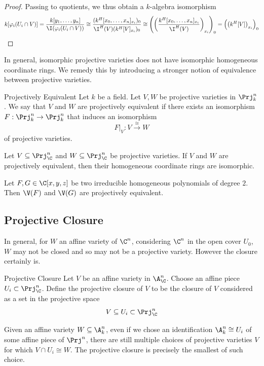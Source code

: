 \documentclass[a4paper]{article}
\begin{document}
\begin{prp}{}{}
\begin{proof}
Passing to quotients, we thus obtain a $k$-algebra isomorphism $$k[\varphi_i(U_i\cap V)]=\frac{k[y_1,\dots,y_n]}{\I(\varphi_i(U_i\cap V))}\cong\frac{(k^H[x_0,\dots,x_n]_{x_i})_0}{\I^H(V)(k^H[V]_{x_i})_0}\cong\left(\left(\frac{k^H[x_0,\dots,x_n]_{x_i}}{\I^H(V)}\right)_{x_i}\right)_0=\left(\left(k^H[V]\right)_{x_i}\right)_0$$
\end{proof}
\end{prp}

In general, isomorphic projective varieties does not have isomorphic homogeneous coordinate rings. We remedy this by introducing a stronger notion of equivalence between projective varieties. 

\begin{defn}{Projectively Equivalent}{} Let $k$ be a field. Let $V,W$ be projective varieties in $\Prj_k^n$. We say that $V$ and $W$ are projectively equivalent if there exists an isomorphism $F:\Prj_k^n\to\Prj_k^n$ that induces an isomorphism $$F|_V:V\overset{\cong}{\longrightarrow}W$$ of projective varieties. 
\end{defn}

\begin{lmm}{}{} Let $V\subseteq\Prj_\C^n$ and $W\subseteq\Prj_\C^n$ be projective varieties. If $V$ and $W$ are projectively equivalent, then their homogeneous coordinate rings are isomorphic. 
\end{lmm}

\begin{lmm}{}{} Let $F,G\in\C[x,y,z]$ be two irreducible homogeneous polynomials of degree $2$. Then $\V(F)$ and $\V(G)$ are projectively equivalent. 
\end{lmm}

\subsection{Projective Closure}
In general, for $W$ an affine variety of $\C^n$, considering $\C^n$ in the open cover $U_0$, $W$ may not be closed and so may not be a projective variety. However the closure certainly is. 

\begin{defn}{Projective Closure}{} Let $V$ be an affine variety in $\A_\C^n$. Choose an affine piece $U_i\subset\Prj_\C^n$. Define the projective closure of $V$ to be the closure of $V$ considered as a set in the projective space $$V\subseteq U_i\subset\Prj_\C^n$$
\end{defn}

Given an affine variety $W\subseteq\A_k^n$, even if we chose an identification $\A_k^n\cong U_i$ of some affine piece of $\Prj^n$, there are still multiple choices of projective varieties $V$ for which $V\cap U_i\cong W$. The projective closure is precisely the smallest of such choice. 
\end{document}
